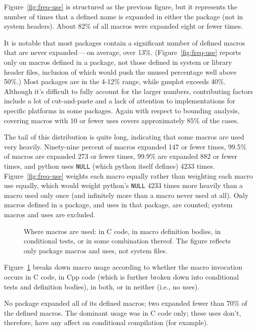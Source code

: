 \documentclass[11pt]{article}
\begin{document}
Figure~\ref{fig:freq-use} is structured as the previous figure, but it
represents the number of times that a defined name is expanded in either
the package (not in system headers).  About 82\% of all macros were
expanded eight or fewer times.

It is notable that most packages contain a significant number of defined
macros that are never expanded\,---\,on average, over 13\%.
(Figure~\ref{fig:freq-use} reports only on macros defined in a package, not
those defined in system or library header files, inclusion of which would
push the unused percentage well above 50\%.)  Most packages are in the
4-12\% range, while gnuplot exceeds 40\%.  Although it's difficult to fully
account for the larger numbers, contributing factors include a lot of
cut-and-paste and a lack of attention to implementations for specific
platforms in some packages.  Again with respect to bounding analysis,
covering macros with 10 or fewer uses covers approximately 85\% of the
cases.

The tail of this distribution is quite long, indicating that some macros
are used very heavily.  Ninety-nine percent of macros expanded 147 or fewer
times, 99.5\% of macros are expanded 273 or fewer times, 99.9\% are
expanded 882 or fewer times, and python uses {\tt NULL} (which python
itself defines) 4233 times.  Figure~\ref{fig:freq-use} weights each macro
equally rather than weighting each macro use equally, which would weight
python's {\tt NULL} 4233 times more heavily than a macro used only once
(and infinitely more than a macro never used at all).  Only macros defined
in a package, and uses in that package, are counted; system macros and uses
are excluded.


\begin{figure}
\centerline{}
\caption{Where macros are used: in C code, in macro definition bodies, in
  conditional tests, or in some combination thereof.  The figure reflects
  only package macros and uses, not system files.}
\label{fig:where-used}
\end{figure}

Figure~\ref{fig:where-used} breaks down macro usage according to whether
the macro invocation occurs in C code, in Cpp code (which is further broken
down into conditional tests and definition bodies), in both, or in neither
(i.e., no uses).  

No package expanded all of its defined macros; two expanded fewer than 70\%
of the defined macros.  The dominant usage was in C code only; these uses
don't, therefore, have any affect on conditional compilation (for example).
\end{document}
